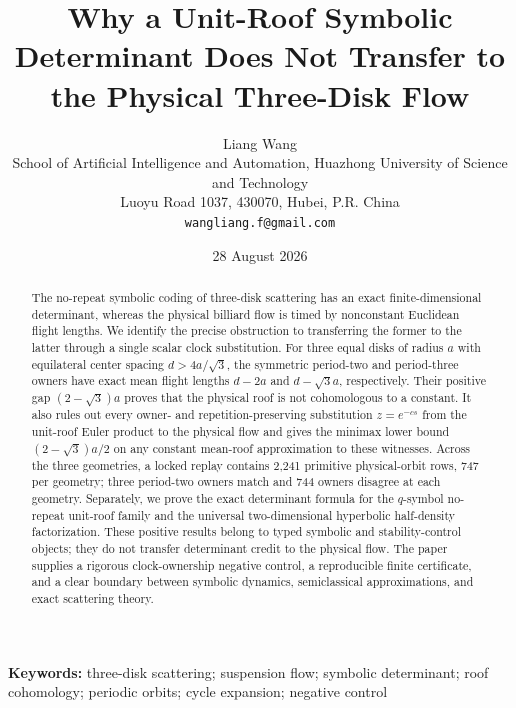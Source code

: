 \documentclass[11pt,a4paper]{article}
\title{Why a Unit-Roof Symbolic Determinant Does Not Transfer to the Physical Three-Disk Flow}
\author{Liang Wang\\
\small School of Artificial Intelligence and Automation, Huazhong University of Science and Technology\\
\small Luoyu Road 1037, 430070, Hubei, P.R. China\\
\small \texttt{wangliang.f@gmail.com}}
\date{28 August 2026}
\theoremstyle{definition}
\theoremstyle{remark}
\begin{document}
\maketitle

\begin{abstract}
The no-repeat symbolic coding of three-disk scattering has an exact finite-dimensional determinant, whereas the physical billiard flow is timed by nonconstant Euclidean flight lengths. We identify the precise obstruction to transferring the former to the latter through a single scalar clock substitution. For three equal disks of radius \(a\) with equilateral center spacing \(d>4a/\sqrt3\), the symmetric period-two and period-three owners have exact mean flight lengths \(d-2a\) and \(d-\sqrt3a\), respectively. Their positive gap \((2-\sqrt3)a\) proves that the physical roof is not cohomologous to a constant. It also rules out every owner- and repetition-preserving substitution \(z=e^{-cs}\) from the unit-roof Euler product to the physical flow and gives the minimax lower bound \((2-\sqrt3)a/2\) on any constant mean-roof approximation to these witnesses. Across the three geometries, a locked replay contains 2,241 primitive physical-orbit rows, 747 per geometry; three period-two owners match and 744 owners disagree at each geometry. Separately, we prove the exact determinant formula for the \(q\)-symbol no-repeat unit-roof family and the universal two-dimensional hyperbolic half-density factorization. These positive results belong to typed symbolic and stability-control objects; they do not transfer determinant credit to the physical flow. The paper supplies a rigorous clock-ownership negative control, a reproducible finite certificate, and a clear boundary between symbolic dynamics, semiclassical approximations, and exact scattering theory.
\end{abstract}

\noindent\textbf{Keywords:} three-disk scattering; suspension flow; symbolic determinant; roof cohomology; periodic orbits; cycle expansion; negative control
\end{document}
